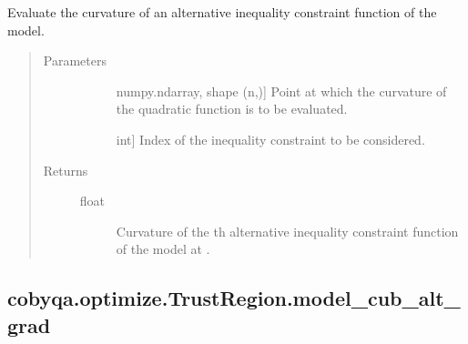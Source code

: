\documentclass[letterpaper,10pt,english]{sphinxmanual}
\begin{document}
\begin{fulllineitems}
\begin{fulllineitems}
\label{\detokenize{refs/generated/cobyqa.optimize.TrustRegion.model_cub_alt_curv:cobyqa.optimize.TrustRegion.model_cub_alt_curv}}
\sphinxAtStartPar
Evaluate the curvature of an alternative inequality constraint function
of the model.
\begin{quote}\begin{description}
\item[{Parameters}] \leavevmode\begin{description}
\item[{}] \leavevmode{[}numpy.ndarray, shape (n,){]}
\sphinxAtStartPar
Point at which the curvature of the quadratic function is to be
evaluated.

\item[{}] \leavevmode{[}int{]}
\sphinxAtStartPar
Index of the inequality constraint to be considered.

\end{description}

\item[{Returns}] \leavevmode\begin{description}
\item[{float}] \leavevmode
\sphinxAtStartPar
Curvature of the \sphinxhyphen{}th alternative inequality constraint function
of the model at .

\end{description}

\end{description}\end{quote}

\end{fulllineitems}



\subsection{cobyqa.optimize.TrustRegion.model\_cub\_alt\_grad}
\label{\detokenize{refs/generated/cobyqa.optimize.TrustRegion.model_cub_alt_grad:cobyqa-optimize-trustregion-model-cub-alt-grad}}\label{\detokenize{refs/generated/cobyqa.optimize.TrustRegion.model_cub_alt_grad::doc}}


\end{fulllineitems}
\end{document}
